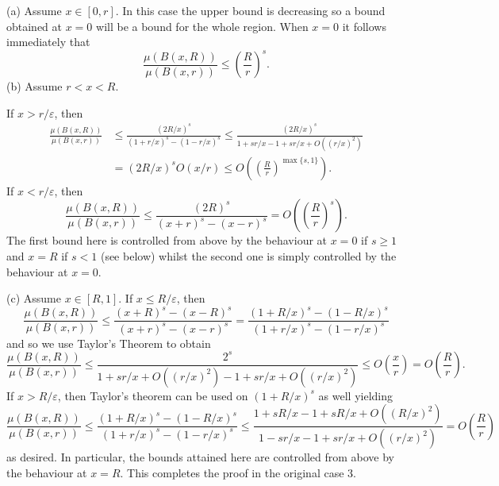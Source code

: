 \documentclass[12pt]{amsart}
\numberwithin{equation}{section}
\renewcommand{\le}{\leqslant}
\renewcommand{\geq}{\geqslant}
\renewcommand{\leq}{\leqslant}
\begin{document}

\noindent (a) Assume $x\in [0,r]$.  In this case the upper bound is decreasing so a bound obtained at $x = 0$ will be a bound for the whole region. When $x=0$ it follows immediately that
\[
\frac{\mu(B(x,R))}{\mu(B(x,r))} \le \left(\frac{R}{r}\right)^s.
\]
\noindent (b) Assume $r < x < R$. 

 If  $x > r/\varepsilon$, then 
\begin{align*}
\frac{\mu(B(x,R))}{\mu(B(x,r))} &\le \frac{(2R/x)^s}{(1+r/x)^s - (1-r/x)^s} \le \frac{(2R/x)^s}{1+sr/x-1+sr/x + O((r/x)^2)}\\ 
&=  (2R/x)^s O(x/r) \le O\left(\left(\frac{R}{r}\right)^{\max\{s,1\}}\right).    
\end{align*}
If $x < r/\varepsilon$, then 
\[
\frac{\mu(B(x,R))}{\mu(B(x,r))} \le \frac{(2R)^s}{(x+r)^s - (x-r)^s} = O\left(\left(\frac{R}{r}\right)^s\right).
\]
The first bound here is controlled from above by the behaviour at  $x=0$ if $s \geq 1$ and $x=R$ if $s <1$ (see below) whilst the second one is simply controlled by the behaviour at $x=0$. 


\noindent (c) Assume  $x \in [R,1]$. If $x \leq R/\varepsilon$, then 
\[
\frac{\mu(B(x,R))}{\mu(B(x,r))} \le \frac{(x+R)^s - (x-R)^s}{(x+r)^s - (x-r)^s} = \frac{(1+R/x)^s - (1-R/x)^s}{(1+r/x)^s - (1-r/x)^s}
\]
and so we use Taylor's Theorem  to obtain
\[
\frac{\mu(B(x,R))}{\mu(B(x,r))} \le \frac{2^s}{1+sr/x + O((r/x)^2)- 1 + sr/x + O((r/x)^2)} \le O\left(\frac{x}{r}\right) = O\left(\frac{R}{r}\right).
\]
If $x > R/\varepsilon$, then  Taylor's theorem can be used on $(1+R/x)^s$ as well yielding
\[
\frac{\mu(B(x,R))}{\mu(B(x,r))} \le \frac{(1+R/x)^s - (1-R/x)^s}{(1+r/x)^s - (1-r/x)^s} \le \frac{1+sR/x - 1 + sR/x + O((R/x)^2)}{1-sr/x -1 + sr/x + O((r/x)^2)} =O\left(\frac{R}{r}\right)
\]
as desired. In particular, the bounds attained here are controlled from above by the  behaviour at $x= R$.   This completes the proof in the original case 3.
\end{document}
